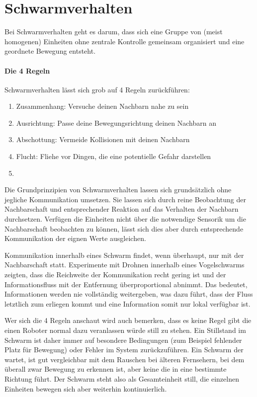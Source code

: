 \section{Schwarmverhalten}\label{sec:Schwarmverhalten}

Bei Schwarmverhalten geht es darum, dass sich eine Gruppe von (meist homogenen) Einheiten ohne zentrale Kontrolle gemeinsam organisiert und eine geordnete Bewegung entsteht.

\paragraph*{Die 4 Regeln}\label{4Rules}
Schwarmverhalten lässt sich grob auf 4 Regeln zurückführen:

\begin{enumerate}
	\item Zusammenhang: Versuche deinen Nachbarn nahe zu sein
	\item Ausrichtung: Passe deine Bewegungsrichtung deinen Nachbarn an
	\item Abschottung: Vermeide Kollisionen mit deinen Nachbarn
	\item Flucht: Fliehe vor Dingen, die eine potentielle Gefahr darstellen
	\item {}
\end{enumerate}

Die Grundprinzipien von Schwarmverhalten lassen sich grundsätzlich ohne jegliche Kommunikation umsetzen.
Sie lassen sich durch reine Beobachtung der Nachbarschaft und entsprechender Reaktion auf das Verhalten der Nachbarn durchsetzen.
Verfügen die Einheiten nicht über die notwendige Sensorik um die Nachbarschaft beobachten zu können, lässt sich dies aber durch entsprechende Kommunikation der eignen Werte ausgleichen.

Kommunikation innerhalb eines Schwarm findet, wenn überhaupt, nur mit der Nachbarschaft statt.
Experimente mit Drohnen innerhalb eines Vogelschwarms zeigten, dass die Reichweite der Kommunikation recht gering ist und der Informationsfluss mit der Entfernung überproportional abnimmt.
Das bedeutet, Informationen werden nie vollständig weitergeben, was dazu führt, dass der Fluss letztlich zum erliegen kommt und eine Information somit nur lokal verfügbar ist.

Wer sich die 4 Regeln anschaut wird auch bemerken, dass es keine Regel gibt die einen Roboter normal dazu veranlassen würde still zu stehen.
Ein Stillstand im Schwarm ist daher immer auf besondere Bedingungen (zum Beispiel fehlender Platz für Bewegung) oder Fehler im System zurückzuführen.
Ein Schwarm der wartet, ist gut vergleichbar mit dem Rauschen bei älteren Fernsehern, bei dem überall zwar Bewegung zu erkennen ist, aber keine die in eine bestimmte Richtung führt.
Der Schwarm steht also als Gesamteinheit still, die einzelnen Einheiten bewegen sich aber weiterhin kontinuierlich.

